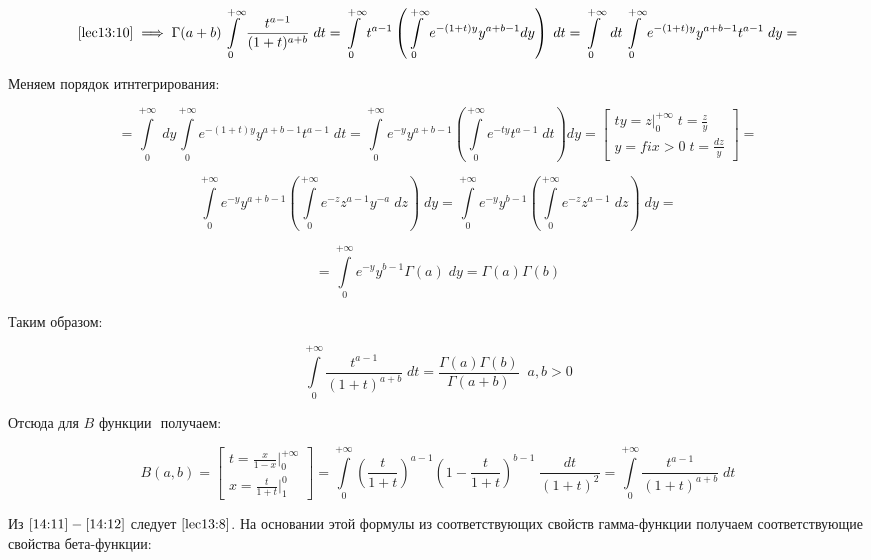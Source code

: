 \documentclass[../../main.tex]{subfiles}
\begin{document}
\[ \eqref{lec13:10} \implies \Gamma (a+b) \int\limits_{0}^{+\infty} \frac{ t^{a-1} }{ (1+t)^{a+b} } \; dt = \int\limits_{0}^{+\infty} t^{a-1} \left(  \int\limits_{0}^{+\infty} e^{-(1+t)y } y^{a+b-1} dy \right) \; dt =  \int\limits_{0}^{+\infty} \; dt  \int\limits_{0}^{+\infty} e^{ -(1+t)y } y^{a+b-1}  t^{a-1} \; dy = \]

Меняем порядок итнтегрирования:

\[ =  \int\limits_{0}^{+\infty} \; dy \int\limits_{0}^{+\infty} e^{ -(1+t)y } y^{a+b-1} t^{a-1} \; dt  = \int\limits_{0}^{+\infty} e^{-y} y^{a+b-1} \left( \int\limits_{0}^{+\infty} e^{-ty} t^{a-1} \; dt \right) dy = \left[  \begin{gathered}
									ty = z \bigg|_{0}^{+\infty} \; t = \frac{z}{y}\\
									y = fix > 0 \; t = \frac{dz}{y} 
										\end{gathered} \right] =   \]

\[  \int\limits_{0}^{+\infty} e^{-y} y^{a+b-1} \left( \int\limits_{0}^{+\infty} e^{-z} z^{a-1} y^{-a}  \; dz   \right) \; dy = \int\limits_{0}^{+\infty} e^{-y} y^{b-1} \left( \int\limits_{0}^{+\infty} e^{-z} z^{a-1}  \; dz \right) \; dy  =  \]


\[ = \int\limits_{0}^{+\infty} e^{-y} y^{b-1} \Gamma(a) \; dy = \Gamma(a) \Gamma(b)  \]

Таким образом:

\begin{equation}
	\label{14:11}
	\int\limits_{0}^{+\infty} \frac{ t^{a-1} }{ (1+t)^{a+b} } \; dt = \frac{\Gamma(a) \Gamma(b)}{\Gamma(a+b)} \; \; a,b > 0
\end{equation}

Отсюда для $B$ функции $\label{13:6}$ получаем: 

\begin{equation}
\label{14:12}
   B(a,b) = \left[  \begin{gathered}
t = \frac{x}{1-x} \bigg|_{0}^{+\infty}\\
x = \frac{t}{1+t}  \bigg|_{1}^{0} 
\end{gathered}   \right]   = \int\limits_{0}^{+\infty} \left(  \frac{t}{1+t} \right)^{a-1} \left(1 - \frac{t}{1+t} \right)^{b-1} \; \frac{dt}{\left( 1+t \right)^2} = \int\limits_{0}^{+\infty} \frac{t^{a-1}}{\left( 1+t \right)^{a+b}} \; dt  
\end{equation}

Из  $\eqref{14:11} - \eqref{14:12}$ следует $\eqref{lec13:8}$. На основании этой формулы из соответствующих свойств гамма-функции получаем соответствующие свойства бета-функции:
\end{document}
